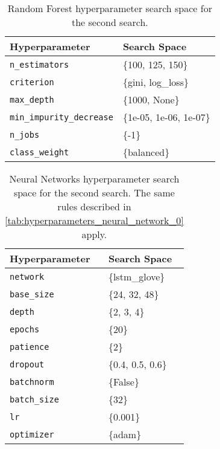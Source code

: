 \begin{table}[H]
\centering
\capstart
\begin{tabularx}{0.48\textwidth}{|l|X|}
\hline
Hyperparameter & Search Space \\
\hline
\texttt{n\_estimators} & \{100, 125, 150\} \\
\texttt{criterion} & \{gini, log\_loss\} \\
\texttt{max\_depth} & \{1000, None\} \\
\texttt{min\_impurity\_decrease} & \{1e-05, 1e-06, 1e-07\} \\
\texttt{n\_jobs} & \{-1\} \\
\texttt{class\_weight} & \{balanced\} \\
\hline
\end{tabularx}
\caption{Random Forest hyperparameter search space for the second search.}
\label{tab:hyperparameters_random_forest_1}

\end{table}


\begin{table}[H]
\centering
\capstart
\begin{tabularx}{0.48\textwidth}{|l|X|}
\hline
Hyperparameter & Search Space \\
\hline
\texttt{network} & \{lstm\_glove\} \\
\texttt{base\_size} & \{24, 32, 48\} \\
\texttt{depth} & \{2, 3, 4\} \\
\texttt{epochs} & \{20\} \\
\texttt{patience} & \{2\} \\
\texttt{dropout} & \{0.4, 0.5, 0.6\} \\
\texttt{batchnorm} & \{False\} \\
\texttt{batch\_size} & \{32\} \\
\texttt{lr} & \{0.001\} \\
\texttt{optimizer} & \{adam\} \\
\hline
\end{tabularx}
\caption{Neural Networks hyperparameter search space for the second search. The same rules described in \autoref{tab:hyperparameters_neural_network_0} apply.}
\label{tab:hyperparameters_neural_network_1}

\end{table}


